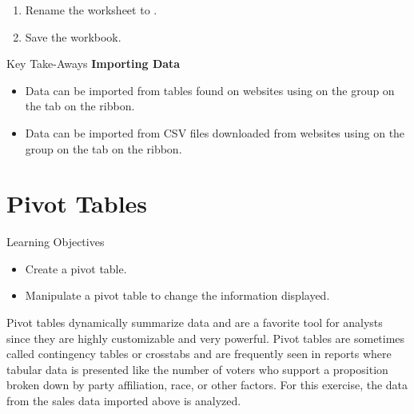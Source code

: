 \begin{enumerate}[resume]
	\item Rename the worksheet to .
	\item Save the workbook.
\end{enumerate}

\begin{center}
	\begin{tkwbox}{Key Take-Aways}
		\textbf{Importing Data}
		\\
		\begin{itemize}
			\setlength{\itemsep}{0pt}
			\setlength{\parskip}{0pt}
			\setlength{\parsep}{0pt}
			
			\item Data can be imported from tables found on websites using  on the  group on the  tab on the ribbon.
			\item Data can be imported from CSV files downloaded from websites using  on the  group on the  tab on the ribbon.
			
		\end{itemize}
	\end{tkwbox}
\end{center}

\section{Pivot Tables}

\begin{center}
	\begin{objbox}{Learning Objectives}
		\begin{itemize}
			\setlength{\itemsep}{0pt}
			\setlength{\parskip}{0pt}
			\setlength{\parsep}{0pt}

			\item Create a pivot table.
			\item Manipulate a pivot table to change the information displayed.
			
		\end{itemize}
	\end{objbox}
\end{center}

Pivot tables dynamically summarize data and are a favorite tool for analysts since they are highly customizable and very powerful. Pivot tables are sometimes called contingency tables or crosstabs and are frequently seen in reports where tabular data is presented like the number of voters who support a proposition broken down by party affiliation, race, or other factors. For this exercise, the data from the sales data imported above is analyzed.

